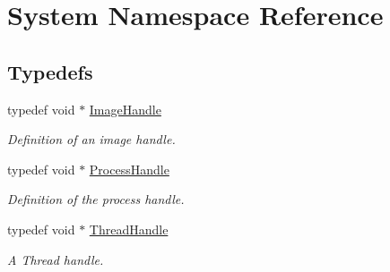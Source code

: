 \hypertarget{namespaceSystem}{
\section{System Namespace Reference}
\label{namespaceSystem}
}
\subsection*{Typedefs}
\begin{DoxyCompactItemize}
\item 
typedef void $\ast$ \hyperlink{namespaceSystem_a21dca3f6170a2b0a0ea3028040ba21b3}{ImageHandle}
\begin{DoxyCompactList}\small\item\em Definition of an image handle. \item\end{DoxyCompactList}\item 
typedef void $\ast$ \hyperlink{namespaceSystem_a7490ee4911e28ad26aa0fcdd00a629df}{ProcessHandle}
\begin{DoxyCompactList}\small\item\em Definition of the process handle. \item\end{DoxyCompactList}\item 
typedef void $\ast$ \hyperlink{namespaceSystem_ad0b1bc3494d9fecebf85204f61224ac6}{ThreadHandle}
\begin{DoxyCompactList}\small\item\em A Thread handle. \item\end{DoxyCompactList}\end{DoxyCompactItemize}
